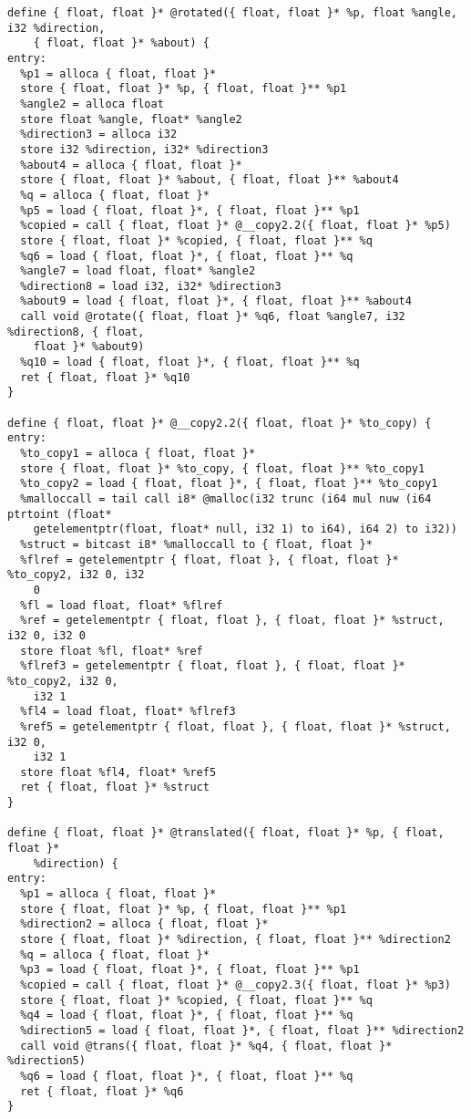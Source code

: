 \documentclass[main.tex]{subfiles}
\begin{document}
{\begin{lstlisting}
define { float, float }* @rotated({ float, float }* %p, float %angle, i32 %direction,
    { float, float }* %about) {
entry:
  %p1 = alloca { float, float }*
  store { float, float }* %p, { float, float }** %p1
  %angle2 = alloca float
  store float %angle, float* %angle2
  %direction3 = alloca i32
  store i32 %direction, i32* %direction3
  %about4 = alloca { float, float }*
  store { float, float }* %about, { float, float }** %about4
  %q = alloca { float, float }*
  %p5 = load { float, float }*, { float, float }** %p1
  %copied = call { float, float }* @__copy2.2({ float, float }* %p5)
  store { float, float }* %copied, { float, float }** %q
  %q6 = load { float, float }*, { float, float }** %q
  %angle7 = load float, float* %angle2
  %direction8 = load i32, i32* %direction3
  %about9 = load { float, float }*, { float, float }** %about4
  call void @rotate({ float, float }* %q6, float %angle7, i32 %direction8, { float,
    float }* %about9)
  %q10 = load { float, float }*, { float, float }** %q
  ret { float, float }* %q10
}

define { float, float }* @__copy2.2({ float, float }* %to_copy) {
entry:
  %to_copy1 = alloca { float, float }*
  store { float, float }* %to_copy, { float, float }** %to_copy1
  %to_copy2 = load { float, float }*, { float, float }** %to_copy1
  %malloccall = tail call i8* @malloc(i32 trunc (i64 mul nuw (i64 ptrtoint (float* 
    getelementptr(float, float* null, i32 1) to i64), i64 2) to i32))
  %struct = bitcast i8* %malloccall to { float, float }*
  %flref = getelementptr { float, float }, { float, float }* %to_copy2, i32 0, i32
    0
  %fl = load float, float* %flref
  %ref = getelementptr { float, float }, { float, float }* %struct, i32 0, i32 0
  store float %fl, float* %ref
  %flref3 = getelementptr { float, float }, { float, float }* %to_copy2, i32 0,
    i32 1
  %fl4 = load float, float* %flref3
  %ref5 = getelementptr { float, float }, { float, float }* %struct, i32 0, 
    i32 1
  store float %fl4, float* %ref5
  ret { float, float }* %struct
}

define { float, float }* @translated({ float, float }* %p, { float, float }* 
    %direction) {
entry:
  %p1 = alloca { float, float }*
  store { float, float }* %p, { float, float }** %p1
  %direction2 = alloca { float, float }*
  store { float, float }* %direction, { float, float }** %direction2
  %q = alloca { float, float }*
  %p3 = load { float, float }*, { float, float }** %p1
  %copied = call { float, float }* @__copy2.3({ float, float }* %p3)
  store { float, float }* %copied, { float, float }** %q
  %q4 = load { float, float }*, { float, float }** %q
  %direction5 = load { float, float }*, { float, float }** %direction2
  call void @trans({ float, float }* %q4, { float, float }* %direction5)
  %q6 = load { float, float }*, { float, float }** %q
  ret { float, float }* %q6
}


\end{lstlisting}}
\end{document}
